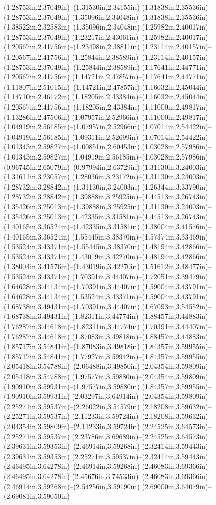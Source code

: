 (1.28753in,2.37049in)--(1.31530in,2.34155in) (1.31838in,2.35536in)--(1.28753in,2.37049in) (1.35096in,2.34048in)--(1.31838in,2.35536in) (1.38522in,2.32583in)--(1.35096in,2.34048in) (1.25982in,2.40017in)--(1.28753in,2.37049in) (1.23217in,2.43061in)--(1.25982in,2.40017in) (1.20567in,2.41756in)--(1.23498in,2.38811in) (1.23114in,2.40157in)--(1.20567in,2.41756in) (1.25844in,2.38589in)--(1.23114in,2.40157in) (1.28753in,2.37049in)--(1.25844in,2.38589in) (1.17641in,2.44771in)--(1.20567in,2.41756in) (1.14721in,2.47857in)--(1.17641in,2.44771in) (1.11807in,2.51015in)--(1.14721in,2.47857in) (1.16032in,2.45044in)--(1.14710in,2.46172in) (1.18205in,2.43384in)--(1.16032in,2.45044in) (1.20567in,2.41756in)--(1.18205in,2.43384in) (1.11000in,2.49817in)--(1.13286in,2.47506in) (1.07957in,2.52966in)--(1.11000in,2.49817in) (1.04919in,2.56185in)--(1.07957in,2.52966in) (1.07014in,2.54422in)--(1.04919in,2.56185in) (1.09311in,2.52699in)--(1.07014in,2.54422in) (1.01343in,2.59827in)--(1.00851in,2.60453in) (1.03028in,2.57986in)--(1.01343in,2.59827in) (1.04919in,2.56185in)--(1.03028in,2.57986in) (0.96745in,2.65079in)--(0.97994in,2.63729in) (1.31130in,3.24003in)--(1.31611in,3.23057in) (1.28036in,3.23172in)--(1.31130in,3.24003in) (1.28732in,3.28842in)--(1.31130in,3.24003in) (1.26344in,3.33790in)--(1.28732in,3.28842in) (1.39888in,3.25925in)--(1.44513in,3.26743in) (1.35426in,3.25013in)--(1.39888in,3.25925in) (1.31130in,3.24003in)--(1.35426in,3.25013in) (1.42335in,3.31581in)--(1.44513in,3.26743in) (1.40165in,3.36524in)--(1.42335in,3.31581in) (1.38004in,3.41576in)--(1.40165in,3.36524in) (1.55445in,3.38370in)--(1.57374in,3.33469in) (1.53524in,3.43371in)--(1.55445in,3.38370in) (1.48194in,3.42866in)--(1.53524in,3.43371in) (1.43019in,3.42270in)--(1.48194in,3.42866in) (1.38004in,3.41576in)--(1.43019in,3.42270in) (1.51612in,3.48477in)--(1.53524in,3.43371in) (1.70391in,3.44407in)--(1.72051in,3.39479in) (1.64628in,3.44134in)--(1.70391in,3.44407in) (1.59004in,3.43791in)--(1.64628in,3.44134in) (1.53524in,3.43371in)--(1.59004in,3.43791in) (1.68738in,3.49431in)--(1.70391in,3.44407in) (1.67093in,3.54552in)--(1.68738in,3.49431in) (1.82311in,3.44774in)--(1.88457in,3.44883in) (1.76287in,3.44618in)--(1.82311in,3.44774in) (1.70391in,3.44407in)--(1.76287in,3.44618in) (1.87083in,3.49818in)--(1.88457in,3.44883in) (1.85717in,3.54841in)--(1.87083in,3.49818in) (1.84357in,3.59955in)--(1.85717in,3.54841in) (1.77927in,3.59942in)--(1.84357in,3.59955in) (2.05418in,3.54788in)--(2.06488in,3.49850in) (2.04354in,3.59809in)--(2.05418in,3.54788in) (1.97577in,3.59880in)--(2.04354in,3.59809in) (1.90910in,3.59931in)--(1.97577in,3.59880in) (1.84357in,3.59955in)--(1.90910in,3.59931in) (2.03297in,3.64914in)--(2.04354in,3.59809in) (2.25271in,3.59537in)--(2.26022in,3.54579in) (2.18208in,3.59632in)--(2.25271in,3.59537in) (2.11233in,3.59724in)--(2.18208in,3.59632in) (2.04354in,3.59809in)--(2.11233in,3.59724in) (2.24525in,3.64573in)--(2.25271in,3.59537in) (2.23786in,3.69689in)--(2.24525in,3.64573in) (2.39631in,3.59353in)--(2.46914in,3.59268in) (2.32414in,3.59443in)--(2.39631in,3.59353in) (2.25271in,3.59537in)--(2.32414in,3.59443in) (2.46495in,3.64278in)--(2.46914in,3.59268in) (2.46083in,3.69366in)--(2.46495in,3.64278in) (2.45676in,3.74533in)--(2.46083in,3.69366in) (2.46914in,3.59268in)--(2.54256in,3.59190in) (2.69000in,3.64079in)--(2.69081in,3.59050in) 
